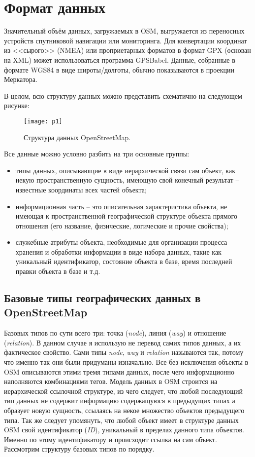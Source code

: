 \section{Формат данных}
Значительный объём данных, загружаемых в OSM, выгружается из переносных 
устройств спутниковой навигации или мониторинга. Для конвертации координат 
из <<сырого>> (NMEA) или проприетарных форматов в формат GPX (основан на XML) 
может использоваться программа GPSBabel. Данные, собранные в формате WGS84 в 
виде широты/долготы, обычно показываются в проекции Меркатора.

В целом, всю структуру данных можно представить схематично на следующем рисунке:
\begin{figure}[ht!]
    \texttt{[image: p1]}
    \caption{Структура данных OpenStreetMap.}
\end{figure}

Все данные можно условно разбить на три основные группы:
\begin{itemize}
    \item типы данных, описывающие в виде иерархической связи сам объект, как 
        некую пространственную сущность, имеющую свой конечный результат -- 
        известные координаты всех частей объекта;
    \item информационная часть -- это описательная характеристика объекта, не 
        имеющая к пространственной географической структуре объекта прямого 
        отношения (его название, физические, логические и прочие свойства);
    \item служебные атрибуты объекта, необходимые для организации процесса 
        хранения и обработки информации в виде набора данных, такие как 
        уникальный идентификатор, состояние объекта в базе, время последней 
        правки объекта в базе и т.д.
\end{itemize}

\subsection{Базовые типы географических данных в OpenStreetMap}
\label{part01}
Базовых типов по сути всего три: точка (\emph{node}), линия (\emph{way}) и 
отношение (\emph{relation}). В данном случае я использую не перевод самих 
типов данных, а их фактическое свойство. Сами типы \emph{node}, \emph{way} и 
\emph{relation} называются так, потому что именно так они были придуманы 
изначально. Все без исключения объекты в OSM описываются этими тремя типами 
данных, после чего информационно наполняются комбинациями тегов. Модель данных 
в OSM строится на иерархической ссылочной структуре, из чего следует, что 
любой последующий тип данных не содержит информацию содержащуюся в предыдущих 
типах а образует новую сущность, ссылаясь на некое множество объектов 
предыдущего типа. Так же следует упомянуть, что любой объект имеет в структуре 
данных OSM свой идентификатор (\emph{ID}), уникальный в пределах данного типа 
объектов. Именно по этому идентификатору и происходит ссылка на сам объект. 
Рассмотрим структуру базовых типов по порядку.

